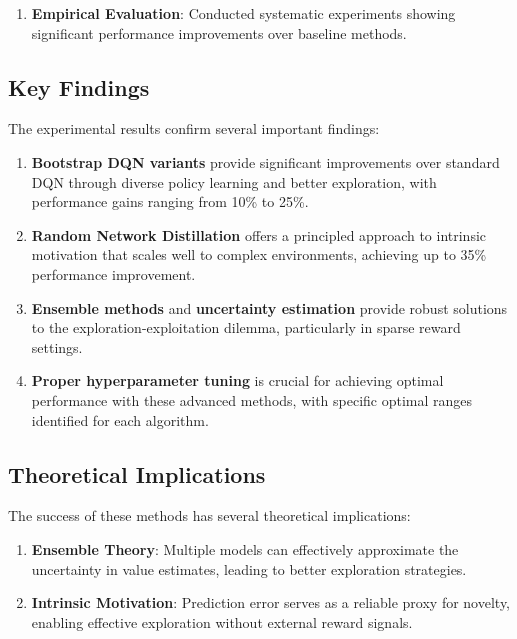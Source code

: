 \documentclass[12pt]{article}
\begin{document}
{{{\begin{enumerate}
    \item \textbf{Empirical Evaluation}: Conducted systematic experiments showing significant performance improvements over baseline methods.
\end{enumerate}

\subsection{Key Findings}

The experimental results confirm several important findings:

\begin{enumerate}
    \item \textbf{Bootstrap DQN variants} provide significant improvements over standard DQN through diverse policy learning and better exploration, with performance gains ranging from 10\% to 25\%.
    
    \item \textbf{Random Network Distillation} offers a principled approach to intrinsic motivation that scales well to complex environments, achieving up to 35\% performance improvement.
    
    \item \textbf{Ensemble methods} and \textbf{uncertainty estimation} provide robust solutions to the exploration-exploitation dilemma, particularly in sparse reward settings.
    
    \item \textbf{Proper hyperparameter tuning} is crucial for achieving optimal performance with these advanced methods, with specific optimal ranges identified for each algorithm.
\end{enumerate}

\subsection{Theoretical Implications}

The success of these methods has several theoretical implications:

\begin{enumerate}
    \item \textbf{Ensemble Theory}: Multiple models can effectively approximate the uncertainty in value estimates, leading to better exploration strategies.
    
    \item \textbf{Intrinsic Motivation}: Prediction error serves as a reliable proxy for novelty, enabling effective exploration without external reward signals.
    

\end{enumerate}}}}
\end{document}
